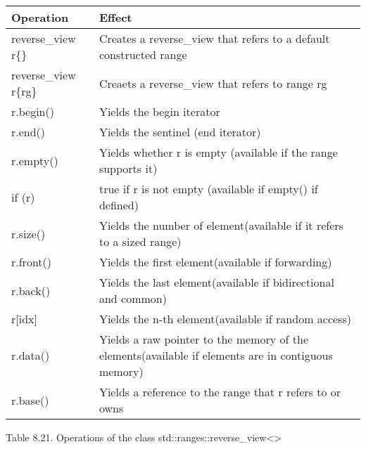 \begin{longtable}[c]{|l|l|}
\hline
\textbf{Operation}    & \textbf{Effect}                                                \\ \hline
\endfirsthead
%
\endhead
%
reverse\_view r\{\} & Creates a reverse\_view that refers to a default constructed range                                 \\ \hline
reverse\_view r\{rg\} & Creaets a reverse\_view that refers to range rg                \\ \hline
r.begin()             & Yields the begin iterator                                      \\ \hline
r.end()               & Yields the sentinel (end iterator)                             \\ \hline
r.empty()             & Yields whether r is empty (available if the range supports it) \\ \hline
if (r)                & true if r is not empty (available if empty() if defined)       \\ \hline
r.size()            & Yields the number of element(available if it refers to a sized range)                              \\ \hline
r.front()             & Yields the first element(available if forwarding)              \\ \hline
r.back()              & Yields the last element(available if bidirectional and common) \\ \hline
r{[}idx{]}            & Yields the n-th element(available if random access)            \\ \hline
r.data()            & Yields a raw pointer to the memory of the elements(available if elements are in contiguous memory) \\ \hline
r.base()              & Yields a reference to the range that r refers to or owns       \\ \hline
\end{longtable}

\begin{center}
Table 8.21. Operations of the class std::ranges::reverse\_view<>
\end{center}

